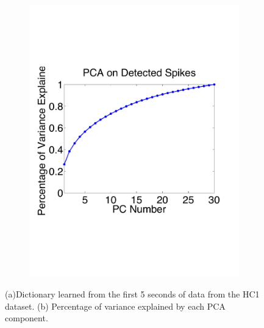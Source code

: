 \begin{center}
\begin{figure}[h!]
\begin{subfigure}[b]{.45\textwidth}
\includegraphics[width=1\textwidth]{../figs/supfigs/pcaenergy}
\caption{}
\label{fig:PCAenergy}
\end{subfigure}
\caption{(a)Dictionary learned from the first 5 seconds of data from the HC1 dataset. (b) Percentage of variance explained by each PCA component.
} \label{fig:dict}
\end{figure}
\end{center}

